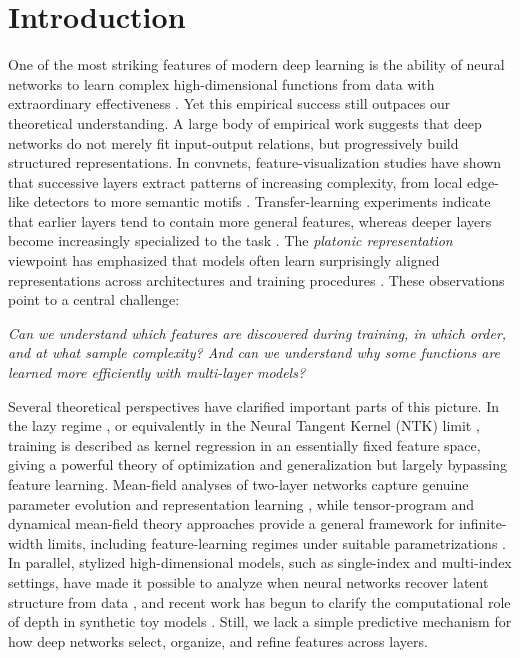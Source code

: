 \section{Introduction}

One of the most striking features of modern deep learning \cite{lecun2015deep} is the ability of neural networks to learn complex high-dimensional functions from data with extraordinary effectiveness \cite{sejnowski2020unreasonable}. Yet this empirical success still outpaces our theoretical understanding. 
A large body of empirical work suggests that deep networks do not merely fit input-output relations, but progressively build structured representations. In convnets, feature-visualization studies have shown that successive layers extract patterns of increasing complexity, from local edge-like detectors to more semantic motifs \cite{zeiler2014visualizing}. Transfer-learning experiments indicate that earlier layers tend to contain more general features, whereas deeper layers become increasingly specialized to the task \cite{yosinski2014how}. The {\it platonic representation} viewpoint has emphasized that models often learn surprisingly aligned representations across architectures and training procedures \cite{huh2024platonic}. These observations point to a central challenge: 

\emph{Can we understand which features are discovered during training, in which order, and at what sample complexity? And can we understand why some functions are learned more efficiently with multi-layer models?}

Several theoretical perspectives have clarified important parts of this picture. In the lazy regime \cite{chizat2019lazy}, or equivalently in the Neural Tangent Kernel (NTK) limit \cite{jacot2018neural,lee2019wide}, training is described as kernel regression in an essentially fixed feature space, giving a powerful theory of optimization and generalization but largely bypassing feature learning. Mean-field analyses of two-layer networks capture genuine parameter evolution and representation learning \cite{mei2018mean,chizat2018global,rotskoff2018neural,sirignano2020meanfield}, while tensor-program and dynamical mean-field theory approaches provide a general framework for infinite-width limits, including feature-learning regimes under suitable parametrizations \cite{yang2021tuning,hajjar2024training,bordelon2022self,pacelli2023statistical}. In parallel, stylized high-dimensional models, such as single-index and multi-index settings, have made it possible to analyze when neural networks recover latent structure from data \cite{ghorbani2020when,bietti2022learning,damian2024computational,troiani2024fundamental}, and recent work has begun to clarify the computational role of depth in synthetic toy models \cite{garnierbrun2025how,cagnetta2024how,favero2021locality,favero2025how,dandi2026computational,ren2026provable}. Still, we lack a simple predictive mechanism for how deep networks select, organize, and refine features across layers.

